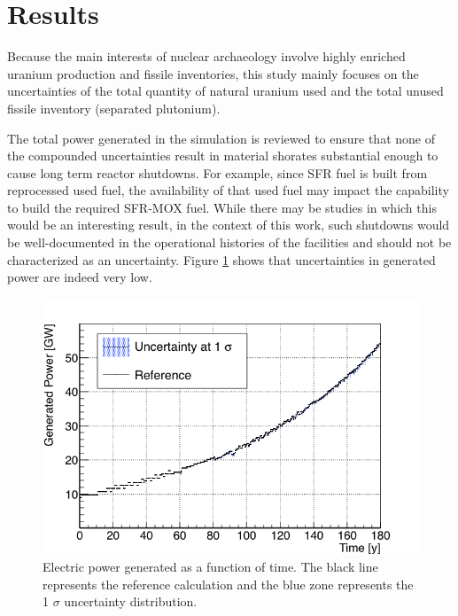 \documentclass{anstrans}
\begin{document}
\section{Results}

Because the main interests of nuclear archaeology involve highly enriched uranium production and
fissile inventories, this study mainly focuses on the uncertainties of
the total quantity of natural uranium used and the total unused fissile
inventory (separated plutonium).

The total power generated in the simulation is reviewed to ensure that none of
the compounded uncertainties result in material shorates substantial enough to
cause long term reactor shutdowns.  For example, since \gls{SFR} fuel is built
from reprocessed used fuel, the availability of that used fuel may impact the
capability to build the required \gls{SFR}-\gls{MOX} fuel.  While there may be studies in
which this would be an interesting result, in the context of this work, such
shutdowns would be well-documented in the operational histories of the
facilities and should not be characterized as an uncertainty.  Figure
\ref{fig:power_full} shows that uncertainties in generated power are indeed
very low.

\begin{figure}[t] %
    \centering
    \includegraphics[scale=0.3]{power_full}
    \caption{Electric power generated as a function of time.  The black line
        represents the reference calculation and the blue zone
        represents the 1 $\sigma$ uncertainty distribution.}\label{fig:power_full}
\end{figure}
\end{document}
